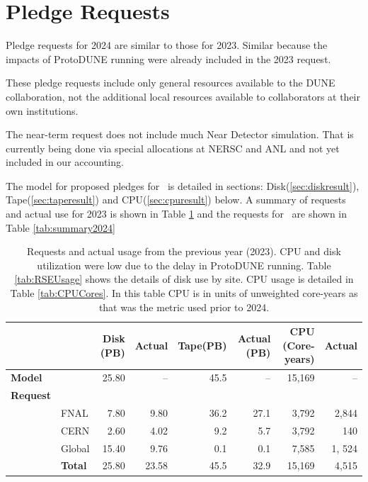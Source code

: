 \documentclass[12pt]{article}
\begin{document}
\section{Pledge Requests}

Pledge requests for 2024 are similar to  those for 2023. Similar because  the impacts of ProtoDUNE running were already included in the 2023 request.

These  pledge requests include only general resources available to the DUNE collaboration, not the additional local resources available to collaborators at their own institutions.  

The near-term request does not include much Near Detector simulation.   That is currently being done via special allocations at NERSC and ANL and not yet included in our accounting.   

The model for proposed pledges for \ThisYear\ is detailed  in sections: Disk(\ref{sec:diskresult}), Tape(\ref{sec:taperesult}) and CPU(\ref{sec:cpuresult}) below.   A summary of requests and actual use for 2023 is shown in Table \ref{tab:summary2023} and the requests for \ThisYear\ are shown in Table \ref{tab:summary2024} 

\begin{table}[h]
\begin{centering}

\begin{tabular}{|ll|rr|rr|rr|}
\hline
 	&&	Disk (PB)	&	Actual	&	Tape(PB)	& Actual (PB)&CPU (Core-years)&Actual\\
	\hline
{\bf Model}	&&	25.80	&	--	&	45.5	&	-- & 15,169 & --	\\
\hline
{\bf Request}	&&		&		&		&	&	&\\
&FNAL	&	7.80	&	9.80&	36.2	& 27.1&	3,792& 2,844	\\
&CERN	&	2.60	&	4.02	&	9.2	& 5.7  &3,792	& 140\\
&Global	&	15.40	&	9.76	&	0.1	&  0.1 &	7,585 &1, 524\\
\hline
&{\bf Total}	&	25.80	& 23.58		&	45.5	& 32.9 & 15,169 	 & 4,515\\
\hline
\end{tabular}

\caption{Requests and actual usage from the previous year (2023).  CPU and disk utilization were low due to the delay in ProtoDUNE running. Table \ref{tab:RSEUsage}  shows the details of disk use by site.  CPU usage is detailed in  Table \ref{tab:CPUCores}. In this table  CPU is in units of unweighted core-years as that was the metric used prior to 2024.   }\label{tab:summary2023}
\end{centering}

\end{table}
\end{document}
